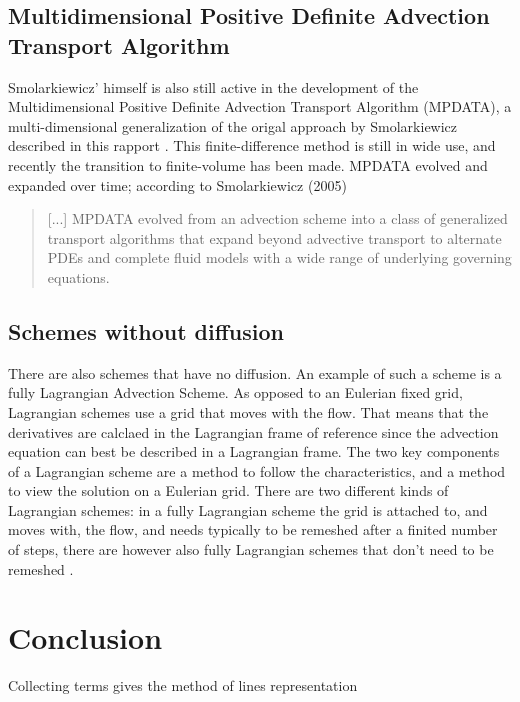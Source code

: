 \documentclass[10pt, a4paper]{article}
\begin{document}
\subsection{Multidimensional Positive Definite Advection Transport Algorithm}
Smolarkiewicz' himself is also still active in the development of the Multidimensional Positive Definite Advection Transport Algorithm (MPDATA), a multi-dimensional generalization of the origal approach by Smolarkiewicz described in this rapport \cite{mpdata}. This finite-difference method is still in wide use, and recently the transition to finite-volume has been made. MPDATA evolved and expanded over time; according to Smolarkiewicz (2005)
\begin{quotation}
[...] MPDATA evolved from an advection scheme into a class of generalized transport algorithms that expand beyond advective transport to alternate PDEs and complete fluid models with a wide range of underlying governing equations.
\end{quotation}

\subsection{Schemes without diffusion}
There are also schemes that have no diffusion. An example of such a scheme is a fully Lagrangian Advection Scheme. As opposed to an Eulerian fixed grid, Lagrangian schemes use a grid that moves with the flow. That means that the derivatives are calclaed in the Lagrangian frame of reference since the advection equation can best be described in a Lagrangian frame. The two key components of a Lagrangian scheme are a method to follow the characteristics, and a method to view the solution on a Eulerian grid. There are two different kinds of Lagrangian schemes: in a fully Lagrangian scheme the grid is attached to, and moves with, the flow, and needs typically to be remeshed after a finited number of steps, there are however also fully Lagrangian schemes that don't need to be remeshed \cite{nodif}.

\section{Conclusion}




Collecting terms gives the method of lines representation
\end{document}
